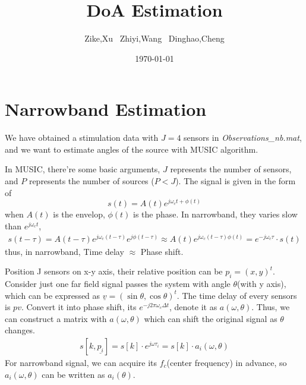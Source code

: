\documentclass[UTF8]{article}
\title{\bf DoA Estimation}
\author{Zike,Xu \ Zhiyi,Wang \ Dinghao,Cheng}
\date{\today}
\newcommand{\ul}{\underline}
\begin{document}
\maketitle
\tableofcontents

\newpage

\section{Narrowband Estimation}
\hspace{0.5em} We have obtained a stimulation data with $J = 4$ sensors in \emph{Observations\_nb.mat}, and we want to estimate angles of the source with MUSIC algorithm.

In MUSIC, there're some basic arguments, $J$ represents the number of sensors, and $P$ represents the number of sources ($P < J$).
The signal is given in the form of
\begin{equation}
    s(t) = A(t)e^{j\omega_c t + \phi(t)}
\end{equation}
when $A(t)$ is the envelop, $\phi(t)$ is the phase. In narrowband, they varies slow than $e^{j \omega_c t}$,
\begin{gather}
    s(t - \tau) = A(t - \tau) e^{j\omega_c(t - \tau)}e^{j\phi(t - \tau)} \approx A(t)e^{j\omega_c(t - \tau) \phi(t)} = e^{-j\omega_c\tau}\cdot s(t)
\end{gather}
thus, in narrowband, Time delay $\approx$ Phase shift.

Position J sensors on x-y axis, their relative position can be $p_i = (x, y)^t$. Consider just one far field signal passes the system with angle $\theta$(with y axis), which can be expressed as $\ul{v} = (\sin \theta, \cos \theta)^t$. The time delay of every sensors is $p v$. Convert it into phase shift, its $e^{-j 2 \pi \omega_c \Delta t}$, denote it as $a(\omega, \theta)$. Thus, we can construct a matrix with $a(\omega, \theta)$ which can shift the original signal as $\theta$ changes.
\begin{gather}
    s[k, \ul{p_i}] = s[k] \cdot e^{j \omega \tau_i} = s[k] \cdot a_i(\omega, \theta)
\end{gather}
For narrowband signal, we can acquire its $f_c$(center frequency) in advance, so $a_i(\omega, \theta)$ can be written as $a_i(\theta)$.
\end{document}
